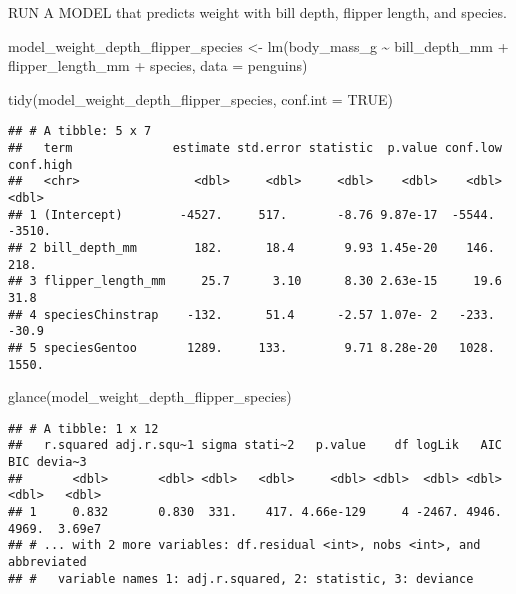 \documentclass[
]{article}
\newenvironment{Shaded}{\begin{snugshade}}{\end{snugshade}}
\newcommand{\AttributeTok}[1]{\textcolor[rgb]{0.77,0.63,0.00}{#1}}
\newcommand{\ConstantTok}[1]{\textcolor[rgb]{0.00,0.00,0.00}{#1}}
\newcommand{\FunctionTok}[1]{\textcolor[rgb]{0.00,0.00,0.00}{#1}}
\newcommand{\NormalTok}[1]{#1}
\newcommand{\OtherTok}[1]{\textcolor[rgb]{0.56,0.35,0.01}{#1}}
\newcommand{\SpecialCharTok}[1]{\textcolor[rgb]{0.00,0.00,0.00}{#1}}
\begin{document}
RUN A MODEL that predicts weight with bill depth, flipper length, and
species.

\begin{Shaded}
\begin{Highlighting}[]
\NormalTok{model\_weight\_depth\_flipper\_species }\OtherTok{\textless{}{-}} \FunctionTok{lm}\NormalTok{(body\_mass\_g }\SpecialCharTok{\textasciitilde{}} 
\NormalTok{                                          bill\_depth\_mm }\SpecialCharTok{+} 
\NormalTok{                                          flipper\_length\_mm }\SpecialCharTok{+} 
\NormalTok{                                          species,}
                                          \AttributeTok{data =}\NormalTok{ penguins)}

\FunctionTok{tidy}\NormalTok{(model\_weight\_depth\_flipper\_species, }\AttributeTok{conf.int =} \ConstantTok{TRUE}\NormalTok{)}
\end{Highlighting}
\end{Shaded}

\begin{verbatim}
## # A tibble: 5 x 7
##   term              estimate std.error statistic  p.value conf.low conf.high
##   <chr>                <dbl>     <dbl>     <dbl>    <dbl>    <dbl>     <dbl>
## 1 (Intercept)        -4527.     517.       -8.76 9.87e-17  -5544.    -3510. 
## 2 bill_depth_mm        182.      18.4       9.93 1.45e-20    146.      218. 
## 3 flipper_length_mm     25.7      3.10      8.30 2.63e-15     19.6      31.8
## 4 speciesChinstrap    -132.      51.4      -2.57 1.07e- 2   -233.      -30.9
## 5 speciesGentoo       1289.     133.        9.71 8.28e-20   1028.     1550.
\end{verbatim}

\begin{Shaded}
\begin{Highlighting}[]
\FunctionTok{glance}\NormalTok{(model\_weight\_depth\_flipper\_species)}
\end{Highlighting}
\end{Shaded}

\begin{verbatim}
## # A tibble: 1 x 12
##   r.squared adj.r.squ~1 sigma stati~2   p.value    df logLik   AIC   BIC devia~3
##       <dbl>       <dbl> <dbl>   <dbl>     <dbl> <dbl>  <dbl> <dbl> <dbl>   <dbl>
## 1     0.832       0.830  331.    417. 4.66e-129     4 -2467. 4946. 4969.  3.69e7
## # ... with 2 more variables: df.residual <int>, nobs <int>, and abbreviated
## #   variable names 1: adj.r.squared, 2: statistic, 3: deviance
\end{verbatim}
\end{document}
